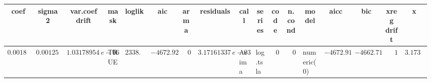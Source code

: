 \begin{table}[!tbp]
\begin{center}
\begin{tabular}{rrrlrrrrllrrlrrrr}
\hline\hline
\multicolumn{1}{c}{coef}&\multicolumn{1}{c}{sigma2}&\multicolumn{1}{c}{var.coef drift}&\multicolumn{1}{c}{mask}&\multicolumn{1}{c}{loglik}&\multicolumn{1}{c}{aic}&\multicolumn{1}{c}{arma}&\multicolumn{1}{c}{residuals}&\multicolumn{1}{c}{call}&\multicolumn{1}{c}{series}&\multicolumn{1}{c}{code}&\multicolumn{1}{c}{n.cond}&\multicolumn{1}{c}{model}&\multicolumn{1}{c}{aicc}&\multicolumn{1}{c}{bic}&\multicolumn{1}{c}{xreg drift}&\multicolumn{1}{c}{x}\tabularnewline
\hline
$0.00184499817117214$&$0.00125571873763051$&$1.03178954218677e-06$&TRUE&$2338.46030334541$&$-4672.92060669082$&$0$&$ 3.17161337736025e-03$&Arima&log.tsla&$0$&$0$&numeric(0)&$-4672.91073014761$&$-4662.71067579428$&$   1$&$3.17345996133772$\tabularnewline
\hline
\end{tabular}\end{center}

\end{table}
